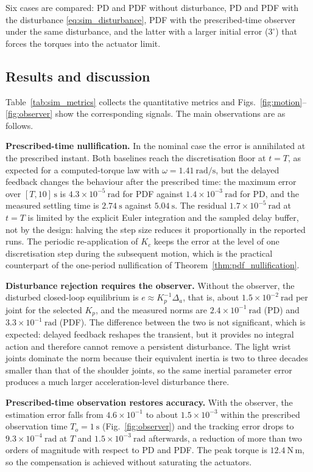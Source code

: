 Six cases are compared: PD and PDF without disturbance, PD and PDF with the disturbance \eqref{eq:sim_disturbance}, PDF with the prescribed-time observer under the same disturbance, and the latter with a larger initial error ($3^\circ$) that forces the torques into the actuator limit.

\subsection{Results and discussion}
Table~\ref{tab:sim_metrics} collects the quantitative metrics and Figs.~\ref{fig:motion}--\ref{fig:observer} show the corresponding signals. The main observations are as follows.

\textbf{Prescribed-time nullification.} In the nominal case the error is annihilated at the prescribed instant. Both baselines reach the discretisation floor at $t=T$, as expected for a computed-torque law with $\omega=1.41~\mathrm{rad/s}$, but the delayed feedback changes the behaviour after the prescribed time: the maximum error over $[T,10]\,\mathrm{s}$ is $4.3\times10^{-5}~\mathrm{rad}$ for PDF against $1.4\times10^{-3}~\mathrm{rad}$ for PD, and the measured settling time is $2.74~\mathrm{s}$ against $5.04~\mathrm{s}$. The residual $1.7\times10^{-5}~\mathrm{rad}$ at $t=T$ is limited by the explicit Euler integration and the sampled delay buffer, not by the design: halving the step size reduces it proportionally in the reported runs. The periodic re-application of $K_c$ keeps the error at the level of one discretisation step during the subsequent motion, which is the practical counterpart of the one-period nullification of Theorem~\ref{thm:pdf_nullification}.

\textbf{Disturbance rejection requires the observer.} Without the observer, the disturbed closed-loop equilibrium is $e\approx K_p^{-1}\Delta_a$, that is, about $1.5\times10^{-2}~\mathrm{rad}$ per joint for the selected $K_p$, and the measured norms are $2.4\times10^{-1}~\mathrm{rad}$ (PD) and $3.3\times10^{-1}~\mathrm{rad}$ (PDF). The difference between the two is not significant, which is expected: delayed feedback reshapes the transient, but it provides no integral action and therefore cannot remove a persistent disturbance. The light wrist joints dominate the norm because their equivalent inertia is two to three decades smaller than that of the shoulder joints, so the same inertial parameter error produces a much larger acceleration-level disturbance there.

\textbf{Prescribed-time observation restores accuracy.} With the observer, the estimation error falls from $4.6\times10^{-1}$ to about $1.5\times10^{-3}$ within the prescribed observation time $T_o=1~\mathrm{s}$ (Fig.~\ref{fig:observer}) and the tracking error drops to $9.3\times10^{-4}~\mathrm{rad}$ at $T$ and $1.5\times10^{-3}~\mathrm{rad}$ afterwards, a reduction of more than two orders of magnitude with respect to PD and PDF. The peak torque is $12.4~\mathrm{N\,m}$, so the compensation is achieved without saturating the actuators.

